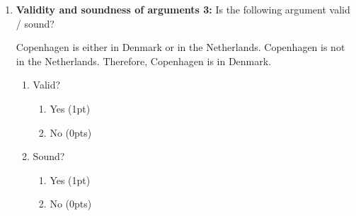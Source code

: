 \documentclass[a4,11pt]{article}
\begin{document}
\begin{enumerate}[leftmargin = 12pt]
\begin{exe}
\ex
\begin{xlist}
 + 2 = 4.
\ex Therefore, Paris is in Europe.
\end{xlist}
\end{exe}
 \begin{enumerate}[noitemsep]
    \item Valid? 
            \begin{enumerate}[noitemsep]
       \item Yes (0pts) 
       \item No (1pt)
         \end{enumerate}
    \item Sound? 
                \begin{enumerate}[noitemsep]
       \item Yes (0pts) 
       \item No (1pt)
                \end{enumerate}
\end{enumerate}

{\bf Model answer:} The correct answer is not valid and not sound. The argument is not valid because its premise (sentences a) does not entail the conclusion (sentence b). We can show that by applying the defeasibility diagnostic: {\em 2+2 = 4 and Paris is not in Europe} is not a contradiction. While the premise of the argument is true (2 + 2 is, in fact, 4), the argument is not sound. It is not sound because an argument can only be sound if meets two criteria: its premises are true and the argument is valid.

\item {\bf Validity and soundness of arguments 3:} Is the following argument valid / sound?
\begin{exe}
\ex
\begin{xlist}
\ex Copenhagen is either in Denmark or in the Netherlands.
\ex Copenhagen is not in the Netherlands.
\ex Therefore, Copenhagen is in Denmark.
\end{xlist}
\end{exe}
 \begin{enumerate}[noitemsep]
    \item Valid? 
            \begin{enumerate}[noitemsep]
       \item Yes (1pt) 
       \item No (0pts)
         \end{enumerate}
    \item Sound? 
                \begin{enumerate}[noitemsep]
       \item Yes (1pt) 
       \item No (0pts)
                \end{enumerate}
\end{enumerate}


\end{enumerate}
\end{document}

